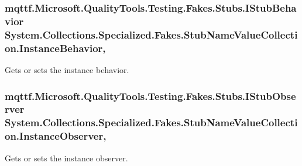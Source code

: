 \hypertarget{class_system_1_1_collections_1_1_specialized_1_1_fakes_1_1_stub_name_value_collection_a957c9aaf2b58b355b3172524ccc5108e}{
\subsubsection[{Instance\-Behavior}]{\setlength{\rightskip}{0pt plus 5cm}mqttf.\-Microsoft.\-Quality\-Tools.\-Testing.\-Fakes.\-Stubs.\-I\-Stub\-Behavior System.\-Collections.\-Specialized.\-Fakes.\-Stub\-Name\-Value\-Collection.\-Instance\-Behavior\hspace{0.3cm}{\ttfamily [get]}, {\ttfamily [set]}}}\label{class_system_1_1_collections_1_1_specialized_1_1_fakes_1_1_stub_name_value_collection_a957c9aaf2b58b355b3172524ccc5108e}


Gets or sets the instance behavior.

\hypertarget{class_system_1_1_collections_1_1_specialized_1_1_fakes_1_1_stub_name_value_collection_acbbb9ecfe72789795195fc67d3e86d9b}{
\subsubsection[{Instance\-Observer}]{\setlength{\rightskip}{0pt plus 5cm}mqttf.\-Microsoft.\-Quality\-Tools.\-Testing.\-Fakes.\-Stubs.\-I\-Stub\-Observer System.\-Collections.\-Specialized.\-Fakes.\-Stub\-Name\-Value\-Collection.\-Instance\-Observer\hspace{0.3cm}{\ttfamily [get]}, {\ttfamily [set]}}}\label{class_system_1_1_collections_1_1_specialized_1_1_fakes_1_1_stub_name_value_collection_acbbb9ecfe72789795195fc67d3e86d9b}


Gets or sets the instance observer.

